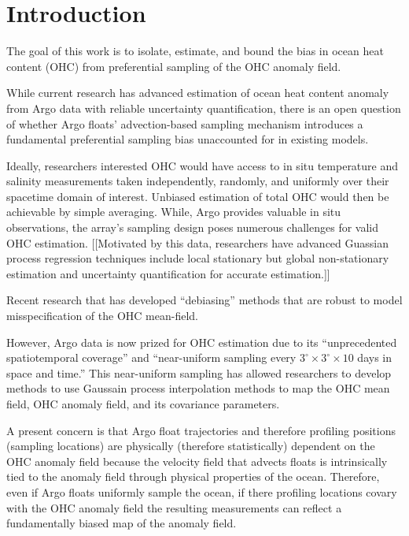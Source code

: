 \section{Introduction}
\label{sec:intro}

The goal of this work is to isolate, estimate, and bound the bias in ocean heat content (OHC) from preferential sampling of the OHC anomaly field.

While current research has advanced estimation of ocean heat content anomaly from Argo data with reliable uncertainty quantification, there is an open question of whether Argo floats' advection-based sampling mechanism introduces a fundamental preferential sampling bias unaccounted for in existing models.

Ideally, researchers interested OHC would have access to in situ temperature and salinity measurements taken independently, randomly, and uniformly over their spacetime domain of interest.
Unbiased estimation of total OHC would then be achievable by simple averaging.
While, Argo provides valuable in situ observations, the array's sampling design poses numerous challenges for valid OHC estimation. 
[[Motivated by this data, researchers have advanced Guassian process regression techniques include local stationary but global non-stationary estimation and uncertainty quantification for accurate estimation.]]

Recent research that has developed ``debiasing'' methods that are robust to model misspecification of the OHC mean-field.\cite{park2023} 

However, Argo data is now prized for OHC estimation due to its ``unprecedented spatiotemporal coverage'' and ``near-uniform sampling every $3^{\circ} \times 3^{\circ} \times 10$ days in space and time.''\cite{park2023} 
This near-uniform sampling has allowed researchers to develop methods to use Gaussain process interpolation methods to map the OHC mean field, OHC anomaly field, and its covariance parameters.

A present concern is that Argo float trajectories and therefore profiling positions (sampling locations) are physically (therefore statistically) dependent 
on the OHC anomaly field because the velocity field that advects floats is intrinsically tied to the anomaly field through physical properties of the ocean.
Therefore, even if Argo floats uniformly sample the ocean, if there profiling locations covary with the OHC anomaly field the resulting measurements can reflect a fundamentally biased map of the anomaly field.


